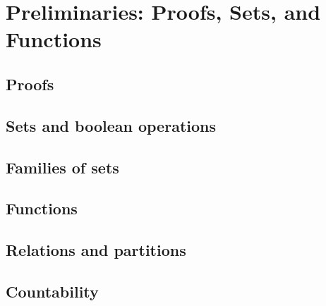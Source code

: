 \chapter{Preliminaries: Proofs, Sets, and Functions}

\section{Proofs}
\section{Sets and boolean operations}
\section{Families of sets}
\section{Functions}
\section{Relations and partitions}
\section{Countability}

